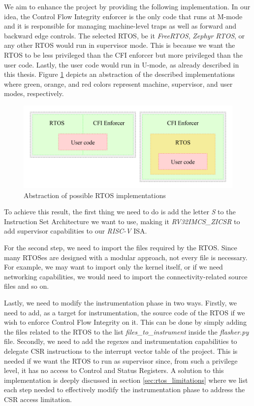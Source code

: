We aim to enhance the project by providing the following implementation. In our
idea, the Control Flow Integrity enforcer is the only code that runs at M-mode and
it is responsible for managing machine-level traps as well as forward and backward
edge controls. The selected RTOS, be it \textit{FreeRTOS}, \textit{Zephyr RTOS},
or any other RTOS would run in supervisor mode. This is because we want the RTOS
to be less privileged than the CFI enforcer but more privileged than the user
code. Lastly, the user code would run in U-mode, as already described in this thesis.
Figure \ref{fig:rtos} depicts an abstraction of the described implementations
where green, orange, and red colors represent machine, supervisor, and user
modes, respectively. \\
\begin{figure}[htbp]
  \centering
  \includegraphics[width=\linewidth]{images/rtos.png}
  \caption{Abstraction of possible RTOS implementations}
  \label{fig:rtos}
\end{figure}

To achieve this result, the first thing we need to do is add the letter \textit{S}
to the Instruction Set Architecture we want to use, making it \textit{RV32IMCS\_ZICSR}
to add supervisor capabilities to our \textit{RISC-V} ISA.

For the second step, we need to import the files required by the RTOS. Since
many RTOSes are designed with a modular approach, not every file is necessary.
For example, we may want to import only the kernel itself, or if we need
networking capabilities, we would need to import the connectivity-related source
files and so on.

Lastly, we need to modify the instrumentation phase in two ways. Firstly, we
need to add, as a target for instrumentation, the source code of the RTOS if we
wish to enforce Control Flow Integrity on it. This can be done by simply adding the
files related to the RTOS to the list \textit{files\_to\_instrument} inside the
\textit{flasher.py} file. Secondly, we need to add the regexes and instrumentation
capabilities to delegate CSR instructions to the interrupt vector table of the project.
This is needed if we want the RTOS to run as supervisor since, from such a privilege
level, it has no access to Control and Status Registers. A solution to this implementation
is deeply discussed in section \ref{sec:rtos_limitations} where we list each step
needed to effectively modify the instrumentation phase to address the CSR access
limitation.

